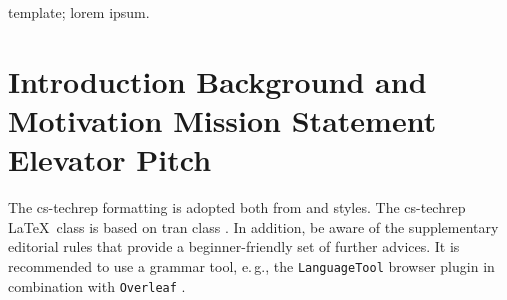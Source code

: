 \documentclass[conference,a4paper,flushend]{cs-techrep}
\begin{document}
\selectlanguage{\cstechrepLang}

\maketitle

\begin{abstract}
This paper demonstrates an example of a technical report in computer science or software engineering, based on the \texttt{cs-techrep} \LaTeX{} class.
The example is intended for beginners, e.\,g., undergraduate students.
It contains a basic outline template and usually fills it with dummy text, but some sections are describing the intent of the outline template and its sections.
Graphic exclamation marks highlight important remarks.
%
\{\,\faWarning{} The abstract does neither mention a thesis in which context a technical report is written nor an institution or any other organizational aspects.
It is a summary of the content of the report, thus, usually the objectives and functional requirements of a piece of software.
Do NOT remove the abstract, this section is mandatory.
Beginners should consider comparing their self-written abstract with the result of a generative AI that summarizes your content after you have written a nearly stable draft version. However, do not use a verbatim copy to replace your abstract, just use generative AI for inspirational purposes.
Do NOT use special characters, symbols, or math in your title or abstract.
Do NOT use cites in your abstract.\}
\end{abstract}

\begin{IEEEkeywords}
template; lorem ipsum.
\end{IEEEkeywords}

\section{Introduction \textbar{} Background and Motivation \textbar{} Mission Statement \textbar{} Elevator Pitch}

The cs-techrep formatting is adopted both from  \cite{ieee2018formattingrules} and  \cite{iaria2014formattingrules} styles.
The cs-techrep \LaTeX\ class is based on tran class \cite{ieee2015howto}.
In addition, be aware of the supplementary  editorial rules \cite{iaria2009editorialrules} \faWarning{} that provide a beginner-friendly set of further advices.
It is recommended to use a grammar tool, e.\,g., the \texttt{LanguageTool} \cite{languagetool} browser plugin in combination with \texttt{Overleaf} \cite{overleaf}.
\end{document}
